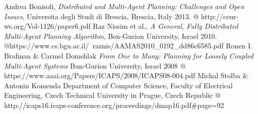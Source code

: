 \documentclass{article}
\begin{document}
\begin{thebibliography}{9}

	Andrea Bonisoli,
	\textit{Distributed and Multi-Agent Planning: Challenges and Open Issues},
	Universita degli Studi di Brescia,
	Brescia, Italy
  2013.
  @ http://ceur-ws.org/Vol-1126/paper6.pdf
  Raz Nissim et al.,
  \textit{A General, Fully Distributed Multi-Agent Planning Algorithm},
  Ben-Gurion University,
  Israel
  2010.
  @https://www.cs.bgu.ac.il/~raznis/AAMAS2010\_0192\_dd86c6585.pdf
  Ronen I. Brafman \& Carmel Domshlak
  \textit{From One to Many: Planning for Loosely Coupled Multi-Agent Systems}
  Bun-Gurion University,
  Israel
  2008
  @ https://www.aaai.org/Papers/ICAPS/2008/ICAPS08-004.pdf
  Michal Stolba \& Antonin Komenda
  Department of Computer Science, Faculty of Electrical Engineering,
  Czech Technical University in Prague, Czech Republic
  @ http://icaps16.icaps-conference.org/proceedings/dmap16.pdf\#page=92
\end{thebibliography}
\end{document}
